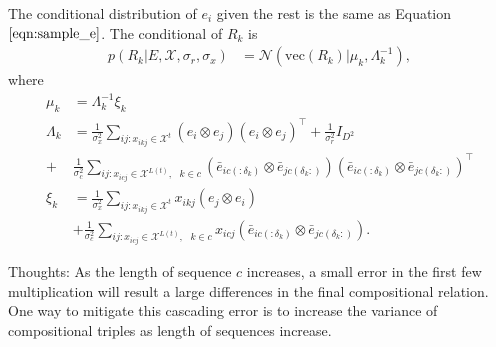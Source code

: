 The conditional distribution of $e_i$ given the rest is the same as Equation $\ref{eqn:sample_e}$. The conditional of $R_k$ is
\begin{align}
p(R_k|E, \mathcal{X}, \sigma_r, \sigma_x)  &= \mathcal{N}(\text{vec}(R_k) | \mu_k, \Lambda_k^{-1}),
\end{align}
where
\begin{align*}
\mu_k &= \Lambda_k^{-1}\xi_k \\
\Lambda_k &= \frac{1}{\sigma_x^2} \sum_{ij:x_{ikj} \in \mathcal{X}^{t}} (e_i \otimes e_j)(e_i \otimes e_j)^\top + \frac{1}{\sigma_r^2} {I}_{D^2} \\
+ &\frac{1}{\sigma_c^2} \sum_{ij:x_{icj} \in \mathcal{X}^{L(t)}, \text{ }k \in c} (\bar{e}_{ic(:\delta_k)} \otimes \bar{e}_{jc(\delta_k:)})(\bar{e}_{ic(:\delta_k)} \otimes \bar{e}_{jc(\delta_k:)} )^\top \\
\xi_k &= \frac{1}{\sigma_x^2} \sum_{ij:x_{ikj} \in \mathcal{X}^{t}} x_{ikj} (e_{j} \otimes e_{i}) \\
& + \frac{1}{\sigma_c^2} \sum_{ij:x_{icj} \in \mathcal{X}^{L(t)}, \text{ }k\in c} x_{icj} (\bar{e}_{ic(:\delta_k)}  \otimes \bar{e}_{jc(\delta_k:)}).
\end{align*}


Thoughts: As the length of sequence $c$ increases, a small error in the first few multiplication will result a large differences in the final compositional relation. One way to mitigate this cascading error is to increase the variance of compositional triples as length of sequences increase.

